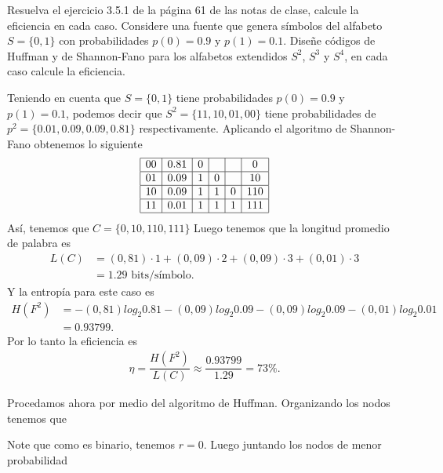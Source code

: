 
Resuelva el ejercicio 3.5.1 de la página 61 de las notas de clase, calcule la eficiencia en cada caso. Considere una fuente que genera símbolos del alfabeto $S =\{0, 1\}$ con probabilidades $p(0) = 0.9$ y $p(1) = 0.1$. Diseñe códigos de Huffman y de Shannon-Fano para los alfabetos extendidos $S^2$, $S^{3}$ y $S^{4}$, en cada caso calcule
la eficiencia.

\begin{sol}
Teniendo en cuenta que $S =\{0, 1\}$ tiene probabilidades $p(0) = 0\text{.}9$ y $p(1) = 0\text{.}1$, podemos decir que $S^{2} =\{11 ,10 ,01 ,00\}$ tiene probabilidades de $p^{2}=\{0\text{.}01 , 0\text{.}09 , 0\text{.}09 , 0\text{.}81\}$ respectivamente. Aplicando el algoritmo de Shannon-Fano obtenemos lo siguiente 
\[
\begin{array}{|c|c|c|c|c|c|}
\hline
00 & 0\text{.}81 & 0 & & & 0\\
\hline
01 & 0\text{.}09 & 1 &0 & & 10\\
\hline
10 & 0\text{.}09 & 1 &1 &0 & 110\\
\hline
11 & 0\text{.}01 & 1 &1 &1 & 111\\
\hline
\end{array}
\]
Así, tenemos que $C=\{0, 10, 110, 111\}$ 
Luego tenemos que la longitud promedio de palabra es 
\begin{align*}
    L(C)&=(0,81)\cdot 1+(0,09)\cdot 2+ (0,09)\cdot 3 +(0,01)\cdot 3\\
    &= 1.29 \text{ bits/símbolo}
.\end{align*}
Y la entropía para este caso es
\begin{align*}
    H(F^{2})&=-(0,81)log_2 0.81-(0,09) log_2 0.09 - (0,09)log_2 0.09 -(0,01)log_2 0.01\\
    &= 0.93799
.\end{align*}
Por lo tanto la eficiencia es 
\begin{align*}
    \eta= \dfrac{H(F^{2})}{L(C)}\approx\dfrac{0.93799}{1.29}=73\%
.\end{align*}

Procedamos ahora por medio del algoritmo de Huffman. Organizando los nodos tenemos que
\begin{center}
    \end{center}
Note que como es binario, tenemos $r=0.$ Luego juntando los nodos de menor probabilidad
\begin{center}
       \begin{tikzpicture}


\end{tikzpicture}
\end{center}
\end{sol}
